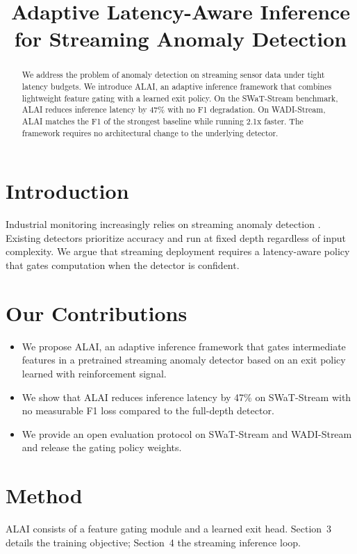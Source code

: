 \documentclass[conference]{IEEEtran}
\title{Adaptive Latency-Aware Inference for Streaming Anomaly Detection}
\author{
  \IEEEauthorblockN{Jia Wei, Sara Patel, Michael Reyes}
  \IEEEauthorblockA{Department of Computer Science, Example University, USA}
}
\begin{document}
\maketitle

\begin{abstract}
We address the problem of anomaly detection on streaming sensor data under
tight latency budgets. We introduce ALAI, an adaptive inference framework that
combines lightweight feature gating with a learned exit policy. On the
SWaT-Stream benchmark, ALAI reduces inference latency by 47\% with no F1
degradation. On WADI-Stream, ALAI matches the F1 of the strongest baseline
while running 2.1x faster. The framework requires no architectural change to
the underlying detector.
\end{abstract}

\section{Introduction}
Industrial monitoring increasingly relies on streaming anomaly detection
\cite{aud24,sl23}. Existing detectors prioritize accuracy and run at
fixed depth regardless of input complexity. We argue that streaming
deployment requires a latency-aware policy that gates computation when the
detector is confident.

\section{Our Contributions}
\begin{itemize}
\item We propose ALAI, an adaptive inference framework that gates intermediate
features in a pretrained streaming anomaly detector based on an exit policy
learned with reinforcement signal.
\item We show that ALAI reduces inference latency by 47\% on SWaT-Stream with
no measurable F1 loss compared to the full-depth detector.
\item We provide an open evaluation protocol on SWaT-Stream and WADI-Stream and
release the gating policy weights.
\end{itemize}

\section{Method}
ALAI consists of a feature gating module and a learned exit head. Section~3
details the training objective; Section~4 the streaming inference loop.
\end{document}
